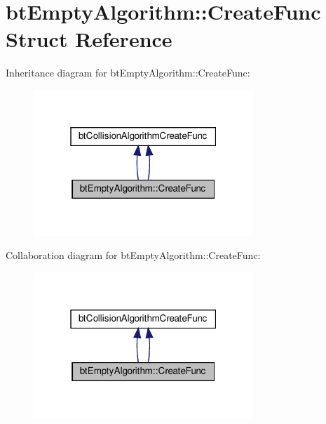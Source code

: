 \hypertarget{structbtEmptyAlgorithm_1_1CreateFunc}{}\section{bt\+Empty\+Algorithm\+:\+:Create\+Func Struct Reference}
\label{structbtEmptyAlgorithm_1_1CreateFunc}


Inheritance diagram for bt\+Empty\+Algorithm\+:\+:Create\+Func\+:
\nopagebreak
\begin{figure}[H]
\begin{center}
\leavevmode
\includegraphics[width=235pt]{structbtEmptyAlgorithm_1_1CreateFunc__inherit__graph}
\end{center}
\end{figure}


Collaboration diagram for bt\+Empty\+Algorithm\+:\+:Create\+Func\+:
\nopagebreak
\begin{figure}[H]
\begin{center}
\leavevmode
\includegraphics[width=235pt]{structbtEmptyAlgorithm_1_1CreateFunc__coll__graph}
\end{center}
\end{figure}
